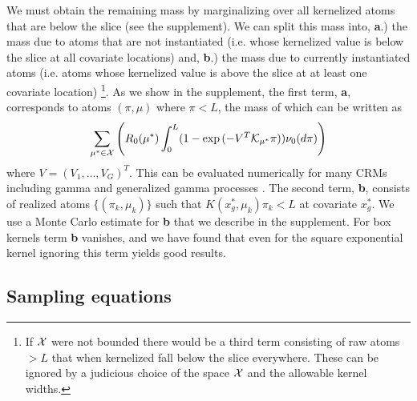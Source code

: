 We must obtain the remaining mass by marginalizing over all kernelized atoms
that are below the slice (see the supplement).  We can
split this mass into, \textbf{a}.) the mass due to atoms that are not instantiated (i.e. whose kernelized value
is below the slice at all covariate locations)
and, \textbf{b}.) the mass due to currently instantiated atoms (i.e. atoms
whose kernelized value is above the slice at at least one covariate location)
\footnote{If $\mathcal{X}$ were not 
bounded there would be a third term consisting of raw atoms $> L$ that when
kernelized fall below the slice everywhere.  These can be ignored by a
judicious choice of the space $\mathcal{X}$ and the allowable kernel widths.}. As we show in the supplement, the first term, \textbf{a}, 
corresponds to atoms
$(\pi,\mu)$ where $\pi < L$, the mass of which can be written as
\begin{align}
  \sum_{\mu^* \in \mathcal{X}} \left ( R_0(\mu^*) \int_0^L (1-\exp{(-V^T
  \mathcal{K}_{\mu^*}\pi)})\nu_0(d\pi) \right )
  \label{eqn:Ltail}
\end{align}
where $V = (V_1, \ldots, V_G)^T$. This can be evaluated numerically for many 
CRMs including gamma and generalized
gamma processes \cite{GriffinWalker:2011}.
The second term, \textbf{b}, consists of realized atoms $\{(\pi_k,\mu_k)\}$ such that 
$K(x^*_g,\mu_k)\pi_k < L$ at covariate $x^*_g$.  We use a Monte Carlo estimate
for \textbf{b} that we describe in the supplement.
For box kernels term \textbf{b} vanishes, and we have found that even for the
square exponential kernel ignoring this term yields good results.

\subsection{Sampling equations}

